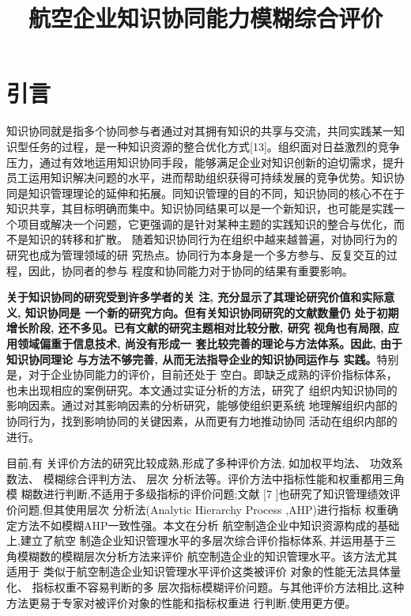 \documentclass[winfonts,UTF8]{ctexart}
\begin{document}
\title{航空企业知识协同能力模糊综合评价}

\section{引言}
\label{sec:intro}

知识协同就是指多个协同参与者通过对其拥有知识的共享与交流，共同实践某一知识型任务的过程，是一种知识资源的整合优化方式[13]。组织面对日益激烈的竞争压力，通过有效地运用知识协同手段，能够满足企业对知识创新的迫切需求，提升员工运用知识解决问题的水平，进而帮助组织获得可持续发展的竞争优势。知识协同是知识管理理论的延伸和拓展。同知识管理的目的不同，知识协同的核心不在于知识共享，其目标明确而集中。知识协同结果可以是一个新知识，也可能是实践一个项目或解决一个问题，它更强调的是针对某种主题的实践知识的整合与优化，而不是知识的转移和扩散。
随着知识协同行为在组织中越来越普遍，对协同行为的研究也成为管理领域的研
究热点。协同行为本身是一个多方参与、反复交互的过程，因此，协同者的参与
程度和协同能力对于协同的结果有重要影响。

\textbf{关于知识协同的研究受到许多学者的关
注, 充分显示了其理论研究价值和实际意义, 知识协同是
一个新的研究方向。但有关知识协同研究的文献数量仍
处于初期增长阶段, 还不多见。已有文献的研究主题相对比较分散, 研究
视角也有局限, 应用领域偏重于信息技术, 尚没有形成一
套比较完善的理论与方法体系。因此, 由于知识协同理论
与方法不够完善, 从而无法指导企业的知识协同运作与
实践。}特别是，对于企业协同能力的评价，目前还处于
空白。即缺乏成熟的评价指标体系，也未出现相应的案例研究。本文通过实证分析的方法，研究了
 组织内知识协同的影响因素。通过对其影响因素的分析研究，能够使组织更系统
地理解组织内部的协同行为，找到影响协同的关键因素，从而更有力地推动协同
活动在组织内部的进行。

目前,有
关评价方法的研究比较成熟,形成了多种评价方法,
如加权平均法、 功效系数法、 模糊综合评判方法、 层次
分析法等。评价方法中指标性能和权重都用三角模
糊数进行判断,不适用于多级指标的评价问题;文献
[7 ]也研究了知识管理绩效评价问题,但其使用层次
分析法(Analytic Hierarchy Process ,AHP)进行指标
权重确定方法不如模糊AHP一致性强。本文在分析
航空制造企业中知识资源构成的基础上,建立了航空
制造企业知识管理水平的多层次综合评价指标体系,
并运用基于三角模糊数的模糊层次分析方法来评价
航空制造企业的知识管理水平。该方法尤其适用于
类似于航空制造企业知识管理水平评价这类被评价
对象的性能无法具体量化、 指标权重不容易判断的多
层次指标模糊评价问题。与其他评价方法相比,这种
方法更易于专家对被评价对象的性能和指标权重进
行判断,使用更方便。
\end{document}
